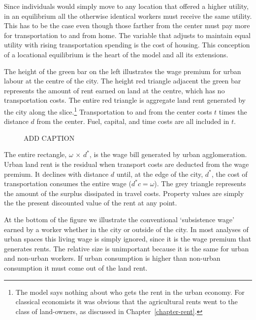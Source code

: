  Since individuals would simply move to any location that offered a higher utility, in an equilibrium all the otherwise identical workers must receive the same utility. This has to be the case even though those farther from the center must pay more for transportation to and from home. The variable that  adjusts to maintain equal utility with rising transportation spending is the cost of housing. This conception of a \gls{locational equilibrium} is the heart of the model and all its extensions.

The height of the green bar on the left illustrates the wage premium for urban labour at the centre of the  city. The height red triangle adjacent the green bar represents the amount of rent earned on land at the centre, which has no transportation costs. The entire red triangle is aggregate land rent generated by the city along the slice.\footnote{The model says nothing about who gets the rent in the urban economy. For classical economists it was obvious that the agricultural rents went to the class of land-owners, as discussed in Chapter~\ref{chapter-rent}.} Transportation to and from the center costs $t$ times the distance $d$ from the center. Fuel, capital, and time costs are  all included in $t$. 

\begin{figure}
    \begin{center}
    
    \caption{ADD CAPTION}
    \label{fig-alonzo-simple}
    \end{center}
\end{figure}

The entire rectangle, $\omega$ $\times$ $d^*$, is the wage bill generated by urban agglomeration. Urban land rent is the residual when transport costs are deducted from the wage premium. It declines with distance $d$ until, at the edge of the city, $d^*$, the cost of transportation consumes the entire wage ($d^*{c}=\omega$). The grey triangle represents the amount of the surplus dissipated in travel costs.  Property values are simply the the present discounted value of the rent at any point.

At the bottom of the figure we illustrate the conventional `subsistence wage'  earned by a worker whether in the city or outside of the city. In most analyses of urban spaces this living wage is simply ignored, since it is the wage premium that generates rents.  The relative size is unimportant because it is the same for urban and non-urban workers. If urban consumption is higher than non-urban consumption it must come out of the land rent.

